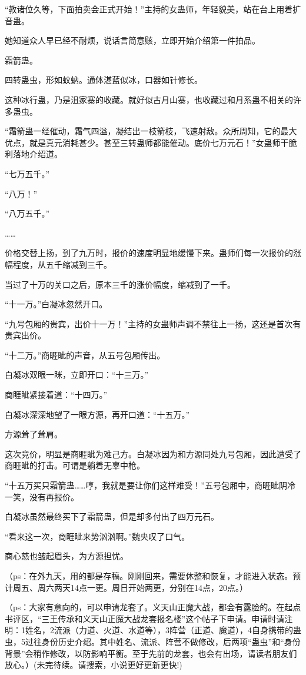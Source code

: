 \begin{this_body}
“教诸位久等，下面拍卖会正式开始！”主持的女蛊师，年轻貌美，站在台上用着扩音蛊。

她知道众人早已经不耐烦，说话言简意赅，立即开始介绍第一件拍品。

霜箭蛊。

四转蛊虫，形如蚊蚋。通体湛蓝似冰，口器如针修长。

这种冰行蛊，乃是沮家寨的收藏。就好似古月山寨，也收藏过和月系蛊不相关的许多蛊虫。

“霜箭蛊一经催动，霜气四溢，凝结出一枝箭枝，飞速射敌。众所周知，它的最大优点，就是真元消耗甚少。甚至三转蛊师都能催动。底价七万元石！”女蛊师干脆利落地介绍道。

“七万五千。”

“八万！”

“八万五千。”

……

价格交替上扬，到了九万时，报价的速度明显地缓慢下来。蛊师们每一次报价的涨幅程度，从五千缩减到三千。

当过了十万的关口之后，原本三千的涨价幅度，缩减到了一千。

“十一万。”白凝冰忽然开口。

“九号包厢的贵宾，出价十一万！”主持的女蛊师声调不禁往上一扬，这还是首次有贵宾出价。

“十二万。”商睚眦的声音，从五号包厢传出。

白凝冰双眼一眯，立即开口：“十三万。”

商睚眦紧接着道：“十四万。”

白凝冰深深地望了一眼方源，再开口道：“十五万。”

方源耸了耸肩。

这次竞价，明显是商睚眦为难己方。白凝冰因为和方源同处九号包厢，因此遭受了商睚眦的打击。可谓是躺着无辜中枪。

“十五万买只霜箭蛊……哼，我就是要让你们这样难受！”五号包厢中，商睚眦阴冷一笑，没有再报价。

白凝冰虽然最终买下了霜箭蛊，但是却多付出了四万元石。

“看来这一次，商睚眦来势汹汹啊。”魏央叹了口气。

商心慈也皱起眉头，为方源担忧。

（ps：在外九天，用的都是存稿。刚刚回来，需要休整和恢复，才能进入状态。预计周五、周六两天14点一更。周日开始两更，分别在14点，20点。）

（ps：大家有意向的，可以申请龙套了。义天山正魔大战，都会有露脸的。在起点书评区，“三王传承和义天山正魔大战龙套报名楼”这个帖子下申请。申请时请注明：1姓名，2流派（力道、火道、水道等），3阵营（正道、魔道），4自身携带的蛊虫，5过往身份历史介绍。其中姓名、流派、阵营不做修改，后两项“蛊虫”和“身份背景”会稍作修改，以防影响平衡。至于先前的龙套，也会有出场，请读者朋友们放心。）(未完待续。请搜索，小说更好更新更快!)

\end{this_body}

